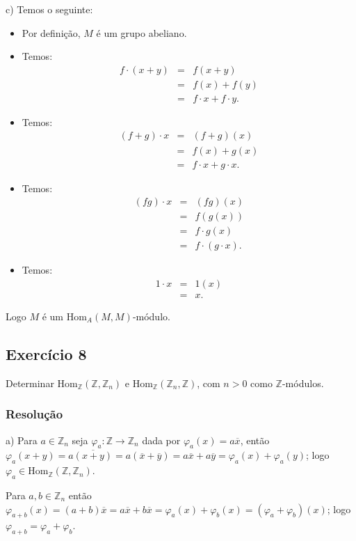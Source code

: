 \documentclass[10pt,a4paper]{article}
\begin{document}
\medskip
\noindent
c) Temos o seguinte:
\begin{itemize}
\item Por definição, $M$ é um grupo abeliano.
\item Temos:
\[
\begin{array}{rcl}
f\cdot(x+y)&=&f(x+y)\\&=&f(x)+f(y)\\&=&f\cdot x+f\cdot y.
\end{array}
\]
\item Temos:
\[
\begin{array}{rcl}
(f+g)\cdot x&=&(f+g)(x)\\&=&f(x)+g(x)\\&=&f\cdot x+g\cdot x.
\end{array}
\]
\item Temos:
\[
\begin{array}{rcl}
(fg)\cdot x&=&(fg)(x)\\&=&f(g(x))\\&=&f\cdot g(x)\\&=&f\cdot(g\cdot x).
\end{array}
\]
\item Temos:
\[
\begin{array}{rcl}
1\cdot x&=&1(x)\\&=&x.
\end{array}
\]
\end{itemize}

\noindent
Logo $M$ é um $\mathrm{Hom}_A(M,M)$-módulo.

\subsection*{Exercício 8}

Determinar $\mathrm{Hom}_\mathbb{Z}(\mathbb{Z},\mathbb{Z}_n)$ e $\mathrm{Hom}_\mathbb{Z}(\mathbb{Z}_n,\mathbb{Z})$, com $n>0$ como $\mathbb{Z}$-módulos.

\subsubsection*{Resolução}

a) Para $a\in\mathbb{Z}_n$ seja $\varphi_a:\mathbb{Z}\rightarrow\mathbb{Z}_n$ dada por $\varphi_a(x)=a\overline{x}$, então $\varphi_a(x+y)=a\overline{(x+y)}=a(\overline{x}+\overline{y})=a\overline{x}+a\overline{y}=\varphi_a(x)+\varphi_a(y)$; logo $\varphi_a\in\mathrm{Hom}_\mathbb{Z}(\mathbb{Z},\mathbb{Z}_n)$.

\medskip
\noindent
Para $a,b\in\mathbb{Z}_n$ então $\varphi_{a+b}(x)=(a+b)\overline{x}=a\overline{x}+b\overline{x}=\varphi_a(x)+\varphi_b(x)=(\varphi_a+\varphi_b)(x)$; logo $\varphi_{a+b}=\varphi_a+\varphi_b$.
\end{document}
